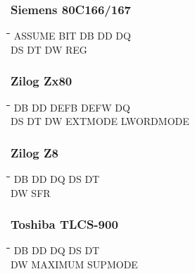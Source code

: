 \subsubsection{Siemens 80C166/167}
{\tt\begin{tabbing}
\hspace{3cm}\=\hspace{3cm}\=\hspace{3cm}\=\hspace{3cm}\=\kill
ASSUME     \> BIT         \> DB          \> DD          \> DQ \\
DS         \> DT          \> DW          \> REG \\
\end{tabbing}}

\subsubsection{Zilog Zx80}
{\tt\begin{tabbing}
\hspace{3cm}\=\hspace{3cm}\=\hspace{3cm}\=\hspace{3cm}\=\kill
DB         \> DD          \> DEFB        \> DEFW        \> DQ \\
DS         \> DT          \> DW          \> EXTMODE     \> LWORDMODE \\
\end{tabbing}}

\subsubsection{Zilog Z8}
{\tt\begin{tabbing}
\hspace{3cm}\=\hspace{3cm}\=\hspace{3cm}\=\hspace{3cm}\=\kill
DB         \> DD          \> DQ          \> DS          \> DT \\
DW         \> SFR \\
\end{tabbing}}

\subsubsection{Toshiba TLCS-900}
{\tt\begin{tabbing}
\hspace{3cm}\=\hspace{3cm}\=\hspace{3cm}\=\hspace{3cm}\=\kill
DB         \> DD          \> DQ          \> DS          \> DT \\
DW         \> MAXIMUM     \> SUPMODE \\
\end{tabbing}}

